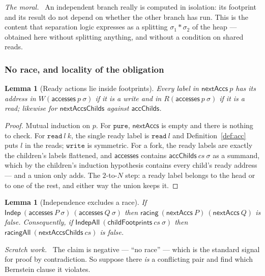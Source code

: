 \documentclass[11pt,a4paper]{article}
\theoremstyle{definition}
\theoremstyle{plain}
\newtheorem{lemma}[definition]{Lemma}
\theoremstyle{remark}
\newenvironment{scratch}{\par\medskip\noindent\textit{Scratch work.}\ \ignorespaces}{\par\medskip}
\newenvironment{moral}{\par\medskip\noindent\textit{The moral.}\ \ignorespaces}{\par\medskip}
\newcommand{\st}{\sigma}
\newcommand{\reads}[1]{R(#1)}
\newcommand{\writes}[1]{W(#1)}
\newcommand{\acc}{\mathsf{accesses}}
\newcommand{\Indep}{\mathsf{Indep}}
\begin{document}
\begin{moral}
An independent branch really is computed in isolation: its footprint and its result do not
depend on whether the other branch has run. This is the content that separation logic
expresses as a splitting $\st_1 \ast \st_2$ of the heap --- obtained here without splitting
anything, and without a condition on shared reads.
\end{moral}

\subsubsection{No race, and locality of the obligation}

\begin{lemma}[Ready actions lie inside footprints]\label{lem:nextaccs}
Every label in $\mathsf{nextAccs}\ p$ has its address in $\writes{\acc\ p\ \st}$ if it is a
write and in $\reads{\acc\ p\ \st}$ if it is a read; likewise for
$\mathsf{nextAccsChilds}$ against $\mathsf{accChilds}$.
\end{lemma}

\begin{proof}
Mutual induction on $p$. For $\texttt{pure}$, $\mathsf{nextAccs}$ is empty and there is
nothing to check. For $\texttt{read}\ l\ k$, the single ready label is $\texttt{read}\ l$
and Definition~\ref{def:acc} puts $l$ in the reads; $\texttt{write}$ is symmetric. For a
fork, the ready labels are exactly the children's labels flattened, and $\acc$ contains
$\mathsf{accChilds}\ cs\ \st$ as a summand, which by the children's induction hypothesis
contains every child's ready address --- and a union only adds. The $2$-to-$N$ step: a ready
label belongs to the head or to one of the rest, and either way the union keeps it.
\end{proof}

\begin{lemma}[Independence excludes a race]\label{lem:norace}
If $\Indep\ (\acc\ P\ \st)\ (\acc\ Q\ \st)$ then
$\mathsf{racing}\ (\mathsf{nextAccs}\ P)\ (\mathsf{nextAccs}\ Q)$ is false. Consequently, if
$\mathsf{IndepAll}\ (\mathsf{childFootprints}\ cs\ \st)$ then
$\mathsf{racingAll}\ (\mathsf{nextAccsChilds}\ cs)$ is false.
\end{lemma}

\begin{scratch}
The claim is negative --- ``no race'' --- which is the standard signal for proof by
contradiction. So suppose there \emph{is} a conflicting pair and find which Bernstein clause
it violates.
\end{scratch}
\end{document}
